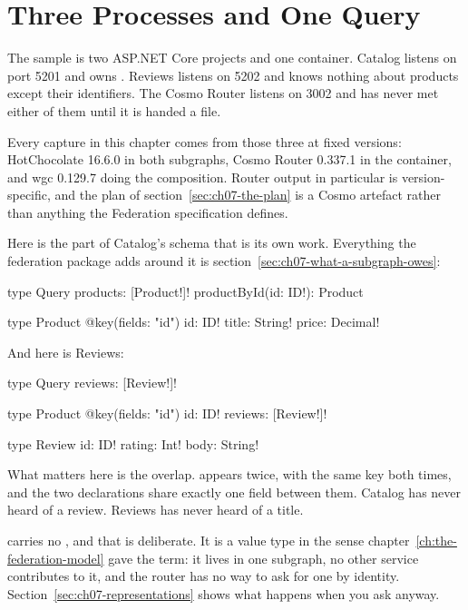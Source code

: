 \section{Three Processes and One Query}
\label{sec:ch07-three-processes}
%

The sample is two ASP.NET Core projects and one container. Catalog listens on
port 5201 and owns . Reviews listens on 5202 and knows nothing
about products except their identifiers. The Cosmo Router listens on 3002 and
has never met either of them until it is handed a file.

Every capture in this chapter comes from those three at fixed versions:
HotChocolate 16.6.0 in both subgraphs, Cosmo Router 0.337.1 in the container,
and wgc 0.129.7 doing the composition. Router output in particular is
version-specific, and the plan of section~\ref{sec:ch07-the-plan} is a Cosmo
artefact rather than anything the Federation specification defines.

%
Here is the part of Catalog's schema that is its own work. Everything the
federation package adds around it is section~\ref{sec:ch07-what-a-subgraph-owes}:

\begin{graphqlsdl}
type Query {
  products: [Product!]!
  productById(id: ID!): Product
}

type Product @key(fields: "id") {
  id: ID!
  title: String!
  price: Decimal!
}
\end{graphqlsdl}

%
And here is Reviews:

\begin{graphqlsdl}
type Query {
  reviews: [Review!]!
}

type Product @key(fields: "id") {
  id: ID!
  reviews: [Review!]!
}

type Review {
  id: ID!
  rating: Int!
  body: String!
}
\end{graphqlsdl}

What matters here is the overlap.  appears twice,
with the same key both times, and the two declarations share exactly one field
between them. Catalog has never heard of a review. Reviews has never heard of a
title.

 carries no , and that is deliberate. It is a value type
in the sense chapter~\ref{ch:the-federation-model} gave the term: it lives in one
subgraph, no other service contributes to it, and the router has no way to ask
for one by identity. Section~\ref{sec:ch07-representations} shows what happens
when you ask anyway.

